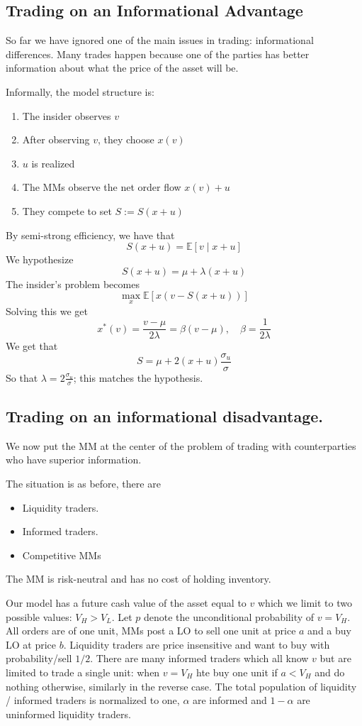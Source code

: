 \documentclass[11pt,a4paper]{article}
\theoremstyle{definition}
\theoremstyle{plain}
\theoremstyle{remark}
\newcommand{\1}{\mathbbm{1}}
\begin{document}
\subsection{Trading on an Informational Advantage}
So far we have ignored one of the main issues in trading: informational differences. 
Many trades happen because one of the parties has better information about what the price of the asset will be. 

Informally, the model structure is: 
\begin{enumerate}[label = (\roman*)]
    \item The insider observes $v$ 
    \item After observing $v$, they choose $x(v)$
    \item $u$ is realized
    \item The MMs observe the net order flow $x(v) + u$
    \item They compete to set $S := S(x+u)$
\end{enumerate}
By semi-strong efficiency, we have that 
$$S(x+u) = \mathbb{E}[v \mid x + u]$$
We hypothesize 
$$S(x+ u) = \mu + \lambda (x+ u)$$
The insider's problem becomes 
$$\max_x \mathbb{E} [x(v-S(x+u))]$$
Solving this we get 
$$x^*(v) = \frac{v- \mu}{2 \lambda} = \beta(v - \mu), \quad \beta = \frac{1}{2\lambda}$$
We get that 
$$S = \mu + 2(x + u) \frac{\sigma_u}{\sigma}$$
So that $\lambda = 2 \frac{\sigma_u}{\sigma}$; this matches the hypothesis. 

\subsection{Trading on an informational disadvantage.} 
We now put the MM at the center of the problem of trading with counterparties who have superior information. 

The situation is as before, there are 
\begin{itemize}
    \item Liquidity traders. 
    \item Informed traders. 
    \item Competitive MMs
\end{itemize}
The MM is risk-neutral and has no cost of holding inventory. 

Our model has a future cash value of the asset equal to $v$ which we limit to two possible 
values: $V_H > V_L$. Let $p$ denote the unconditional probability of $v = V_H$. 
All orders are of one unit, MMs post a LO to sell one unit at price $a$ and a buy LO at price $b$. 
Liquidity traders are price insensitive and want to buy with probability/sell $1/2$. 
There are many informed traders which all know $v$ but are limited to trade a single unit: 
when $v = V_H$ hte buy one unit if $a< V_H$ and do nothing otherwise, similarly in the reverse case. 
The total population of liquidity / informed traders is normalized to one, $\alpha$ are informed and $1-\alpha$
are uninformed liquidity traders. 
\end{document}
